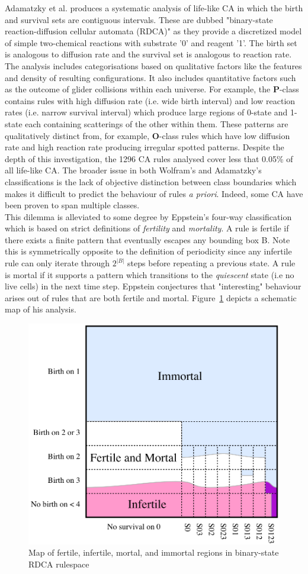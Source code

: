 Adamatzky et al.\cite{adamatzky2006phenomenology} produces a systematic analysis of life-like CA in which the birth and survival sets are contiguous intervals. These are dubbed "binary-state reaction-diffusion cellular automata (RDCA)" as they provide a discretized model of simple two-chemical reactions with substrate '0' and reagent '1'. The birth set is analogous to diffusion rate and the survival set is analogous to reaction rate. The analysis includes categorisations based on qualitative factors like the features and density of resulting configurations. It also includes quantitative factors such as the outcome of glider collisions within each universe. For example, the \textbf{P}-class contains rules with high diffusion rate (i.e. wide birth interval) and low reaction rates (i.e. narrow survival interval) which produce large regions of 0-state and 1-state each containing scatterings of the other within them. These patterns are qualitatively distinct from, for example, \textbf{O}-class rules which have low diffusion rate and high reaction rate producing irregular spotted patterns. Despite the depth of this investigation, the 1296 CA rules analysed cover less that 0.05\% of all life-like CA. The broader issue in both Wolfram's and Adamatzky's classifications is the lack of objective distinction between class boundaries which makes it difficult to predict the behaviour of rules \textit{a priori}. Indeed, some CA have been proven to span multiple classes\cite{baldwin1999classi}.\\

This dilemma is alleviated to some degree by Eppstein's four-way classification\cite{eppstein2010growth} which is based on strict definitions of \textit{fertility} and \textit{mortality}. A rule is fertile if there exists a finite pattern that eventually escapes any bounding box B. Note this is symmetrically opposite to the definition of periodicity since any infertile rule can only iterate through $2^{|B|}$ steps before repeating a previous state. A rule is mortal if it supports a pattern which transitions to the \textit{quiescent} state (i.e no live cells) in the next time step. Eppstein conjectures that "interesting" behaviour arises out of rules that are both fertile and mortal. Figure~\ref{fig:eppstein-map} depicts a schematic map of his analysis.\\

\begin{figure}[!h]
\centering
    \includegraphics[width=.5\textwidth]{images/eppstein-map.png}
    \caption{Map of fertile, infertile, mortal, and immortal regions in binary-state RDCA rulespace \cite{eppstein2010growth}}
\label{fig:eppstein-map}
\end{figure}

